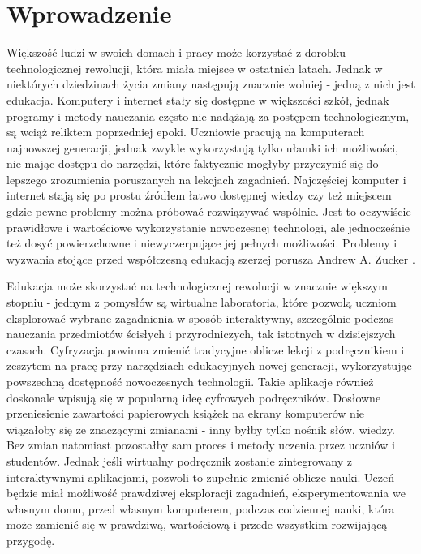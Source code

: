 \chapter{Wprowadzenie}
\label{cha:wprowadzenie}

Większość ludzi w swoich domach i pracy może korzystać z dorobku technologicznej
rewolucji, która miała miejsce w ostatnich latach. Jednak w niektórych
dziedzinach życia zmiany następują znacznie wolniej - jedną z nich jest
edukacja. Komputery i internet stały się dostępne w większości szkół, jednak
programy i metody nauczania często nie nadążają za postępem technologicznym, są
wciąż reliktem poprzedniej epoki. Uczniowie pracują na komputerach najnowszej
generacji, jednak zwykle wykorzystują tylko ułamki ich możliwości, nie mając
dostępu do narzędzi, które faktycznie mogłyby przyczynić się do lepszego
zrozumienia poruszanych na lekcjach zagadnień. Najczęściej komputer i internet
stają się po prostu źródłem łatwo dostępnej wiedzy czy też miejscem gdzie pewne
problemy można próbować rozwiązywać wspólnie. Jest to oczywiście prawidłowe i
wartościowe wykorzystanie nowoczesnej technologi, ale jednocześnie też dosyć
powierzchowne i niewyczerpujące jej pełnych możliwości. Problemy i wyzwania
stojące przed współczesną edukacją szerzej porusza Andrew A. Zucker
\cite{Zuc2009}.

Edukacja może skorzystać na technologicznej rewolucji w znacznie większym
stopniu - jednym z pomysłów są wirtualne laboratoria, które pozwolą uczniom
eksplorować wybrane zagadnienia w sposób interaktywny, szczególnie podczas
nauczania przedmiotów ścisłych i przyrodniczych, tak istotnych w dzisiejszych
czasach. Cyfryzacja powinna zmienić tradycyjne oblicze lekcji z podręcznikiem i
zeszytem na pracę przy narzędziach edukacyjnych nowej generacji, wykorzystując
powszechną dostępność nowoczesnych technologii. Takie aplikacje również
doskonale wpisują się w popularną ideę cyfrowych podręczników. Dosłowne
przeniesienie zawartości papierowych książek na ekrany komputerów nie wiązałoby
się ze znaczącymi zmianami - inny byłby tylko nośnik słów, wiedzy. Bez zmian
natomiast pozostałby sam proces i metody uczenia przez uczniów i studentów.
Jednak jeśli wirtualny podręcznik zostanie zintegrowany z interaktywnymi
aplikacjami, pozwoli to zupełnie zmienić oblicze nauki. Uczeń będzie miał
możliwość prawdziwej eksploracji zagadnień, eksperymentowania we własnym domu,
przed własnym komputerem, podczas codziennej nauki, która może zamienić się w
prawdziwą, wartościową i przede wszystkim rozwijającą przygodę.

